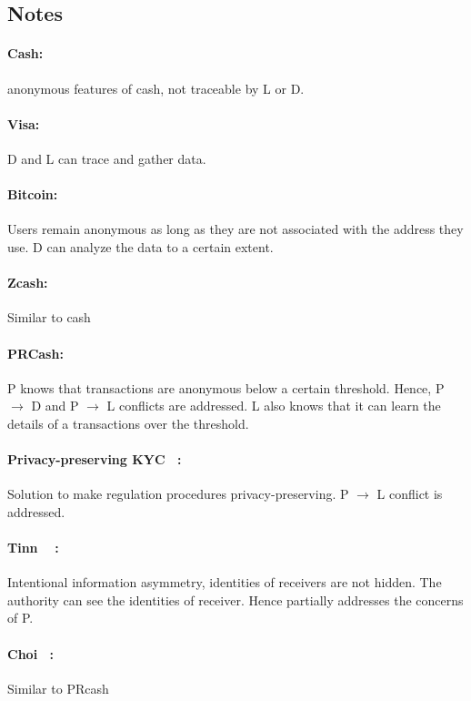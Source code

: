 \documentclass[runningheads]{llncs}
\begin{document}
 \subsection*{Notes}
  \paragraph{Cash:}  anonymous features of cash, not traceable by L or D.
 
 \paragraph{Visa:} D and L  can trace and gather data.
 
 \paragraph{Bitcoin:}  Users remain anonymous as long as they are not associated with the address they use. D can analyze the data to a certain extent. 
 
 \paragraph{Zcash: } Similar to cash
 
 \paragraph{PRCash:} P knows that transactions are anonymous below a certain threshold. Hence, P $\rightarrow$ D and  P $\rightarrow$ L conflicts are addressed. L also knows that it can learn the details of a transactions over the threshold.
 
 \paragraph{Privacy-preserving KYC~\cite{BKT18} :} Solution to make regulation procedures privacy-preserving. P $\rightarrow$ L conflict is addressed.
 
 \paragraph{Tinn \etal ~\cite{TB21}	:} Intentional information asymmetry, identities of receivers are not hidden. The authority can see the identities of receiver. Hence partially addresses the concerns of P. 
 
 \paragraph{Choi \etal~\cite{CHLRS21}:} Similar to PRcash
 
\end{document}
